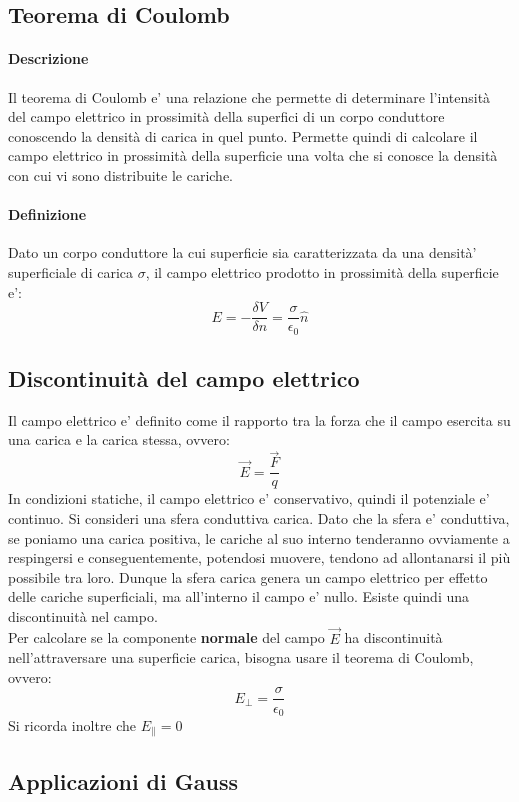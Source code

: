\documentclass[a4paper, 10pt]{article}
\begin{document}
		\subsection{Teorema di Coulomb}
			\paragraph*{Descrizione}
			Il teorema di Coulomb e' una relazione che permette di determinare l'intensità del campo elettrico in prossimità della
			superfici di un corpo conduttore conoscendo la densità di carica in quel punto. Permette quindi di calcolare il campo
			elettrico in prossimità della superficie una volta che si conosce la densità con cui vi sono distribuite le cariche.
			\paragraph*{Definizione}Dato un corpo conduttore la cui superficie sia caratterizzata da una densità' superficiale di 
			carica $\sigma$, il campo elettrico prodotto in prossimità della superficie e':
			\[ E = -\frac{\delta V}{\delta n} = \frac{\sigma}{\epsilon_0} \widehat{n} \]
		\subsection{Discontinuità del campo elettrico}
			Il campo elettrico e' definito come il rapporto tra la forza che il campo esercita su una carica e la carica stessa,
			ovvero: \[ \overrightarrow{E} = \frac{\overrightarrow{F}}{q} \]
			In condizioni statiche, il campo elettrico e' conservativo, quindi il potenziale e' continuo. 
			Si consideri una sfera conduttiva carica. Dato che la sfera e' conduttiva, se poniamo una carica positiva, le cariche al 
			suo interno tenderanno ovviamente a respingersi e conseguentemente, potendosi muovere, tendono ad allontanarsi il più
			possibile tra loro. Dunque la sfera carica genera un campo elettrico per effetto delle cariche superficiali, 
			ma all'interno il campo e' nullo. Esiste quindi una discontinuità nel campo. \\
			Per calcolare se la componente \textbf{normale} del campo $\overrightarrow{E}$ ha discontinuità nell'attraversare 
			una superficie carica, bisogna usare il teorema di Coulomb, ovvero:
			\[ E_{\bot} = \frac{\sigma}{\epsilon_0} \]
			Si ricorda inoltre che $E_{\parallel} = 0$
		\subsection{Applicazioni di Gauss}
\end{document}
